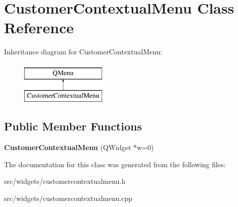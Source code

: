 \hypertarget{classCustomerContextualMenu}{\section{Customer\+Contextual\+Menu Class Reference}
\label{classCustomerContextualMenu}
}
Inheritance diagram for Customer\+Contextual\+Menu\+:\begin{figure}[H]
\begin{center}
\leavevmode
\includegraphics[height=2.000000cm]{d5/db9/classCustomerContextualMenu}
\end{center}
\end{figure}
\subsection*{Public Member Functions}
\begin{DoxyCompactItemize}
\item 
\hypertarget{classCustomerContextualMenu_a798a08f4b8526398a54752e7de87930e}{{\bfseries Customer\+Contextual\+Menu} (Q\+Widget $\ast$w=0)}\label{classCustomerContextualMenu_a798a08f4b8526398a54752e7de87930e}

\end{DoxyCompactItemize}


The documentation for this class was generated from the following files\+:\begin{DoxyCompactItemize}
\item 
src/widgets/customercontextualmenu.\+h\item 
src/widgets/customercontextualmenu.\+cpp\end{DoxyCompactItemize}
